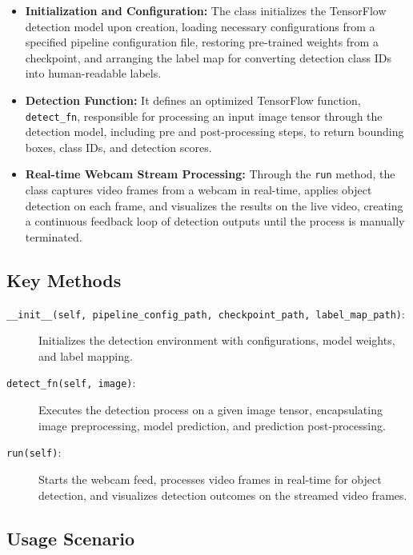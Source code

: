 \begin{itemize}
	\item \textbf{Initialization and Configuration:} The class initializes the TensorFlow detection model upon creation, loading necessary configurations from a specified pipeline configuration file, restoring pre-trained weights from a checkpoint, and arranging the label map for converting detection class IDs into human-readable labels.
	
	\item \textbf{Detection Function:} It defines an optimized TensorFlow function, \texttt{detect\_fn}, responsible for processing an input image tensor through the detection model, including pre and post-processing steps, to return bounding boxes, class IDs, and detection scores.
	
	\item \textbf{Real-time Webcam Stream Processing:} Through the \texttt{run} method, the class captures video frames from a webcam in real-time, applies object detection on each frame, and visualizes the results on the live video, creating a continuous feedback loop of detection outputs until the process is manually terminated.
\end{itemize}

\subsection{Key Methods}

\begin{description}
	\item[\texttt{\_\_init\_\_(self, pipeline\_config\_path, checkpoint\_path, label\_map\_path)}:] Initializes the detection environment with configurations, model weights, and label mapping.
	
	\item[\texttt{detect\_fn(self, image)}:] Executes the detection process on a given image tensor, encapsulating image preprocessing, model prediction, and prediction post-processing.
	
	\item[\texttt{run(self)}:] Starts the webcam feed, processes video frames in real-time for object detection, and visualizes detection outcomes on the streamed video frames.
\end{description}

\subsection{Usage Scenario}

